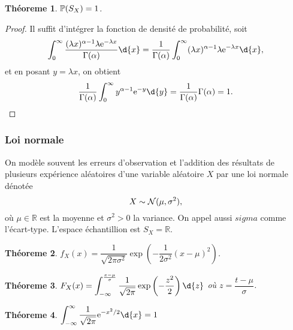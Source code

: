 \documentclass[11pt]{article}
\renewcommand\P{%
	\ensuremath{%
		\mathbb{P}%
	}%
}%
\newcommand\e{%
	\ensuremath{%
		\mathrm{e}%
	}%
}%
\newcommand\Norm{%
	\ensuremath{%
		\mathcal{N}%
	}%
}%
\newtheorem{theoreme}{Théoreme}[section]
\begin{document}
\begin{theoreme}
	$\P(S_X)=1$.
\end{theoreme}

\begin{proof}
	Il suffit d'intégrer la fonction de densité de probabilité, soit
	\begin{equation*}
		\int_0^\infty
			\frac{(\lambda x)^{\alpha-1}\lambda\e^{-\lambda x}}{\Gamma(\alpha)}
		\d{x}=\frac{1}{\Gamma(\alpha)}\int_0^\infty
			(\lambda x)^{\alpha-1}\lambda\e^{-\lambda x}\d{x},
	\end{equation*}
	et en posant $y=\lambda x$, on obtient
	\begin{equation*}
		\frac{1}{\Gamma(\alpha)}\int_0^\infty y^{\alpha-1}\e^{-y}\d{y}
		=\frac{1}{\Gamma(\alpha)}\Gamma{(\alpha)}=1.\qedhere
	\end{equation*}
\end{proof}

\subsubsection{Loi normale}
On modèle souvent les erreurs d'observation et l'addition des résultats de
plusieurs expérience aléatoires d'une variable aléatoire $X$ par une loi
normale dénotée
\begin{equation*}
	X\sim\Norm(\mu,\sigma^2),
\end{equation*}
où $\mu\in\mathbb{R}$ est la moyenne et $\sigma^2>0$ la variance. On appel
aussi $sigma$ comme l'écart-type. L'espace échantillion est $S_X=\mathbb{R}$.

\begin{theoreme}
	$f_X(x)=\dfrac{1}{\sqrt{2\pi\sigma^2}}\exp\left(
		{-\dfrac{1}{2\sigma^2}(x-\mu)^2}
	\right)$.
\end{theoreme}

\begin{theoreme}
	$F_X(x)=\displaystyle\int_{-\infty}^{\frac{x-\mu}{\sigma}}
		\dfrac{1}{\sqrt{2\pi}}\exp\left(-\dfrac{z^2}{2}\right)\d{z}$
	où $z=\dfrac{t-\mu}{\sigma}$.
\end{theoreme}

\begin{theoreme}
	$\displaystyle\int_{-\infty}^\infty
	\frac{1}{\sqrt{2\pi}}\e^{-x^2/2}\d{x}=1$
\end{theoreme}
\end{document}
